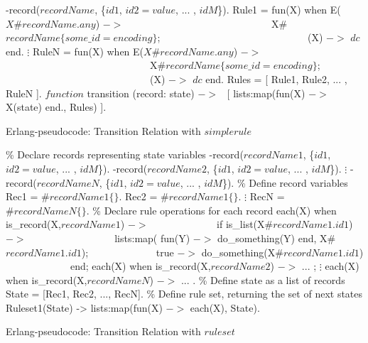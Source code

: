 \begin{algorithm}
\begin{algorithmic}
\STATE -record($recordName$, \{$id1$, $id2 = value$, $...$ , $idM$\}).
\newline
\STATE Rule1 =  fun(X) when E(\(X\#recordName.any\)) $->$ 
\STATE \ \ \ \ \ \ \ \ \ \ \ \ \ \ \ \ \ \ \ \ \ \ \ \ \ \ \ \ \ 
X\#\(recordName\{some\_id = encoding\}\); 
\STATE \ \ \ \ \ \ \ \ \ \ \ \ \ \ \ \ \ \ \ \ \ \ \ \ \ \ \ \ \
(X) $->$ $dc$ end.
\STATE $\vdots$
\STATE RuleN =  fun(X) when E(\(X\#recordName.any\))  $->$ 
\STATE \ \ \ \ \ \ \ \ \ \ \ \ \ \ \ \ \ \ \ \ \ \ \ \ \ \ \ \ \ 
X\#\(recordName\{some\_id = encoding\}\); 
\STATE \ \ \ \ \ \ \ \ \ \ \ \ \ \ \ \ \ \ \ \ \ \ \ \ \ \ \ \ \
(X) $->$ $dc$ end.
\newline
\STATE Rules = [ Rule1, Rule2, ... , RuleN ].
\newline
\STATE $function$ transition (record: state) $->$ 
\STATE \ [ lists:map(fun(X) $->$ X(state) end., Rules) ].
\caption{Erlang-pseudocode: Transition Relation with $simplerule$}
\label{TRsimplerule}
\end{algorithmic}
\end{algorithm}


\begin{algorithm}
\begin{algorithmic}
\STATE \% Declare records representing state variables
\STATE -record($recordName1$, \{$id1$, $id2 = value$, $...$ , $idM$\}).
\STATE -record($recordName2$, \{$id1$, $id2 = value$, $...$ , $idM$\}).
\STATE $\vdots$
\STATE -record($recordNameN$, \{$id1$, $id2 = value$, $...$ , $idM$\}).
\newline
\STATE \% Define record variables
\STATE Rec1  =  $\#recordName1\{\}.$ 
\STATE Rec2  =  $\#recordName1\{\}.$ 
\STATE $\vdots$
\STATE RecN  =  $\#recordNameN\{\}.$ 
\newline
\STATE \% Declare rule operations for each record 
\STATE each(X) when is\_record(X,$recordName1$) $->$
\STATE \ \ \ \ \ \ \ \ \ \ \ \ \ if is\_list(X\#$recordName1.id1$) $->$
\STATE \ \ \ \ \ \ \ \ \ \ \ \ \ \ \ \ \ lists:map( fun(Y) $->$ 
                           do\_something(Y) end, X\#$recordName1.id1$);          
\STATE \ \ \ \ \ \ \ \ \ \ \ \ \ true $->$ do\_something(X\#$recordName1.id1$)
\STATE \ \ \ \ \ \ \ \ \ \ \ \ \ end;
\STATE each(X) when is\_record(X,$recordName2$) $->$ ... ;
\STATE $\vdots$
\STATE each(X) when is\_record(X,$recordNameN$) $->$ ... .
\newline
\STATE \% Define state as a list of records
\STATE State =  [Rec1, Rec2, ..., RecN].
\newline
\STATE \% Define rule set, returning the set of next states
\STATE Ruleset1(State) -> lists:map(fun(X) $->$ each(X), State).
\caption{Erlang-pseudocode: Transition Relation with $ruleset$}
\label{TRrulseset}
\end{algorithmic}
\end{algorithm}



